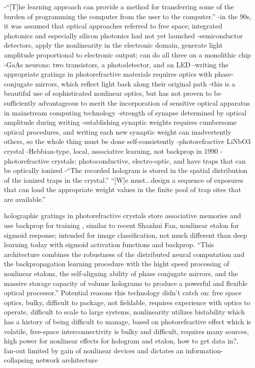 -``[T]he learning approach can provide a method for transferring some of the burden of programming the computer from the user to the computer.''
-in the 90s, it was assumed that optical approaches referred to free space; integrated photonics and especially silicon photonics had not yet launched
-semiconductor detectors, apply the nonlinearity in the electronic domain, generate light amplitude proportional to electronic output; can do all three on a monolithic chip
-GaAs neurons: two transistors, a photodetector, and an LED
-writing the appropriate gratings in photorefractive materials requires optics with phase-conjugate mirrors, which reflect light back along their original path
-this is a beautiful use of sophisticated nonlinear optics, but has not proven to be sufficiently advantageous to merit the incorporation of sensitive optical apparatus in mainstream computing technology
-strength of synapse determined by optical amplitude during writing
-establishing synaptic weights requires cumbersome optical procedures, and writing each new synaptic weight can inadvertently others, so the whole thing must be done self-consistently
-photorefractive LiNbO3 crystal
-Hebbian-type, local, associative learning, not backprop in 1990
-photorefractive crystals: photoconductive, electro-optic, and have traps that can be optically ionized
-``The recorded hologram is stored in the spatial distribution of the ionized traps in the crystal.'' ``[W]e must...design a sequence of exposures that can load the appropriate weight values in the finite pool of trap sites that are available.''

\vspace{3em}
\cite{waps1987}
holographic gratings in photorefractive crystals store associative memories and use backprop for training \cite{waps1987}, similar to recent Shanhui Fan, nonlinear etalon for sigmoid response; intended for image classification, not much different than deep learning today with sigmoid activation functions and backprop. ``This architecture combines the robustness of the distributed neural computation and the backpropagation learning procedure with the hight speed processing of nonlinear etalons, the self-aligning ability of phase conjugate mirrors, and the massive storage capacity of volume holograms to produce a powerful and flexible optical processor.'' Potential reasons this technology didn't catch on: free space optics, bulky, difficult to package, not fieldable, requires experience with optics to operate, difficult to scale to large systems, nonlinearity utilizes bistability \cite{gi1985} which has a history of being difficult to manage, based on photorefractive effect which is volatile, free-space interconnectivity is bulky and difficult, requires many sources, high power for nonlinear effects for hologram and etalon, how to get data in?, fan-out limited by gain of nonlinear devices and dictates an information-collapsing network architecture

